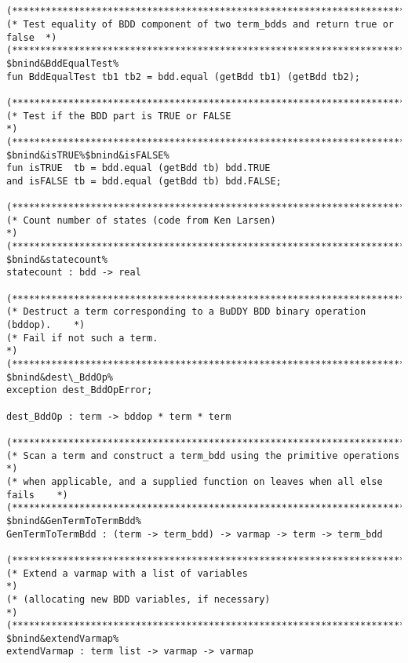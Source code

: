 \documentclass[12pt]{article}
\begin{document}
\begin{footnotesize}
\begin{Verbatim}[commandchars=\$\&\%]


(*****************************************************************************)
(* Test equality of BDD component of two term_bdds and return true or false  *)
(*****************************************************************************)
$bnind&BddEqualTest%
fun BddEqualTest tb1 tb2 = bdd.equal (getBdd tb1) (getBdd tb2);

(*****************************************************************************)
(* Test if the BDD part is TRUE or FALSE                                     *)
(*****************************************************************************)
$bnind&isTRUE%$bnind&isFALSE%
fun isTRUE  tb = bdd.equal (getBdd tb) bdd.TRUE
and isFALSE tb = bdd.equal (getBdd tb) bdd.FALSE;

(*****************************************************************************)
(* Count number of states (code from Ken Larsen)                             *)
(*****************************************************************************)
$bnind&statecount%
statecount : bdd -> real

(*****************************************************************************)
(* Destruct a term corresponding to a BuDDY BDD binary operation (bddop).    *)
(* Fail if not such a term.                                                  *)
(*****************************************************************************)
$bnind&dest\_BddOp%
exception dest_BddOpError;

dest_BddOp : term -> bddop * term * term

(*****************************************************************************)
(* Scan a term and construct a term_bdd using the primitive operations       *)
(* when applicable, and a supplied function on leaves when all else fails    *)
(*****************************************************************************)
$bnind&GenTermToTermBdd%
GenTermToTermBdd : (term -> term_bdd) -> varmap -> term -> term_bdd

(*****************************************************************************)
(* Extend a varmap with a list of variables                                  *)
(* (allocating new BDD variables, if necessary)                              *)
(*****************************************************************************)
$bnind&extendVarmap%
extendVarmap : term list -> varmap -> varmap






\end{Verbatim}
\end{footnotesize}
\end{document}
